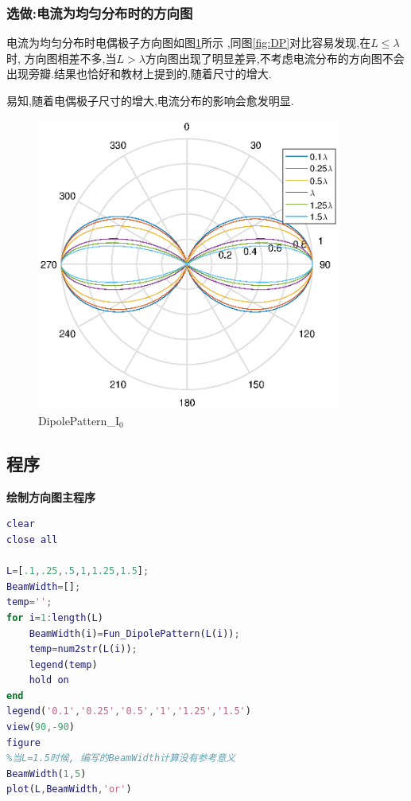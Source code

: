\subsubsection{选做:电流为均匀分布时的方向图}
电流为均匀分布时电偶极子方向图如图\ref{fig:DP_i0}所示 ,同图\ref{fig:DP}对比容易发现,在$L\le\lambda$时, 方向图相差不多,当$L>\lambda$方向图出现了明显差异,不考虑电流分布的方向图不会出现旁瓣.结果也恰好和教材上提到的,随着尺寸的增大.

易知,随着电偶极子尺寸的增大,电流分布的影响会愈发明显.
\begin{figure}[!ht]
	\centering
	\includegraphics[width=10cm]{DipolePattern_i0junyun.eps}
	\caption{DipolePattern\_$\mathrm{I_0}$} \label{fig:DP_i0}
\end{figure}






\newpage
\subsection{程序}
\noindent \textbf{绘制方向图主程序}
\begin{lstlisting}[language={matlab},keywordstyle=\color{blue!70},commentstyle=\color{red!50!green!50!blue!50},frame=shadowbox, rulesepcolor=\color{red!20!green!20!blue!20}] 
clear
close all

L=[.1,.25,.5,1,1.25,1.5];
BeamWidth=[];
temp='';
for i=1:length(L)
    BeamWidth(i)=Fun_DipolePattern(L(i));
    temp=num2str(L(i));
    legend(temp)   
    hold on 
end
legend('0.1','0.25','0.5','1','1.25','1.5')
view(90,-90)
figure
%当L=1.5时候, 编写的BeamWidth计算没有参考意义
BeamWidth(1,5)
plot(L,BeamWidth,'or')

\end{lstlisting}

